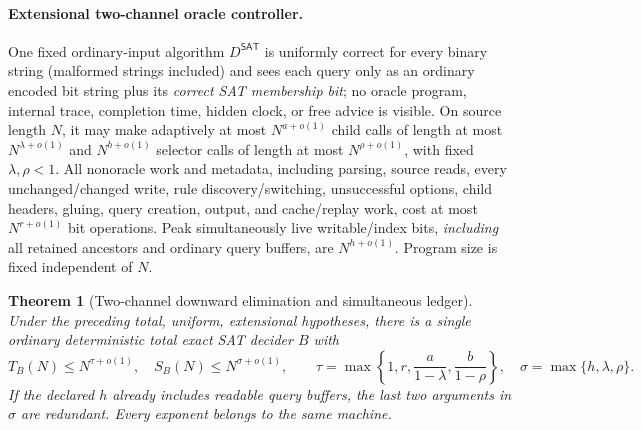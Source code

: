 \documentclass[11pt]{article}
\newtheorem{theorem}{Theorem}
\newcommand{\SAT}{\mathsf{SAT}}
\begin{document}
\paragraph{Extensional two-channel oracle controller.}
One fixed ordinary-input algorithm $D^{\SAT}$ is uniformly correct for every binary string (malformed strings included) and sees each query only as an ordinary encoded bit string plus its \emph{correct SAT membership bit}; no oracle program, internal trace, completion time, hidden clock, or free advice is visible. On source length $N$, it may make adaptively at most $N^{a+o(1)}$ child calls of length at most $N^{\lambda+o(1)}$ and $N^{b+o(1)}$ selector calls of length at most $N^{\rho+o(1)}$, with fixed $\lambda,\rho<1$. All nonoracle work and metadata, including parsing, source reads, every unchanged/changed write, rule discovery/switching, unsuccessful options, child headers, gluing, query creation, output, and cache/replay work, cost at most $N^{r+o(1)}$ bit operations. Peak simultaneously live writable/index bits, \emph{including} all retained ancestors and ordinary query buffers, are $N^{h+o(1)}$. Program size is fixed independent of $N$.
\begin{theorem}[Two-channel downward elimination and simultaneous ledger]
Under the preceding total, uniform, extensional hypotheses, there is a \emph{single ordinary deterministic total exact SAT decider} $B$ with
\[
T_B(N)\le N^{\tau+o(1)},\quad
S_B(N)\le N^{\sigma+o(1)},\qquad
\tau=\max\left\{1,r,\frac{a}{1-\lambda},\frac{b}{1-\rho}\right\},\quad
\sigma=\max\{h,\lambda,\rho\}.
\]
If the declared $h$ already includes readable query buffers, the last two arguments in $\sigma$ are redundant. Every exponent belongs to the same machine.
\end{theorem}
\end{document}
